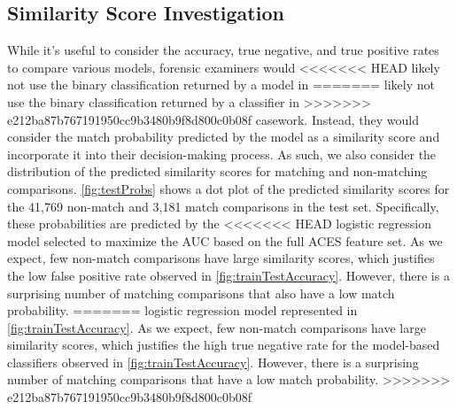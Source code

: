 \documentclass[reprint]{JASA}
\begin{document}
\hypertarget{similarity-score-investigation}{%
\subsection{Similarity Score
Investigation}\label{similarity-score-investigation}}

While it's useful to consider the accuracy, true negative, and true
positive rates to compare various models, forensic examiners would
<<<<<<< HEAD
likely not use the binary classification returned by a model in
=======
likely not use the binary classification returned by a classifier in
>>>>>>> e212ba87b767191950cc9b3480b9f8d800c0b08f
casework. Instead, they would consider the match probability predicted
by the model as a similarity score and incorporate it into their
decision-making process. As such, we also consider the distribution of
the predicted similarity scores for matching and non-matching
comparisons. \autoref{fig:testProbs} shows a dot plot of the predicted
similarity scores for the 41,769 non-match and 3,181 match comparisons
in the test set. Specifically, these probabilities are predicted by the
<<<<<<< HEAD
logistic regression model selected to maximize the AUC based on the full
ACES feature set. As we expect, few non-match comparisons have large
similarity scores, which justifies the low false positive rate observed
in \autoref{fig:trainTestAccuracy}. However, there is a surprising
number of matching comparisons that also have a low match probability.
=======
logistic regression model represented in
\autoref{fig:trainTestAccuracy}. As we expect, few non-match comparisons
have large similarity scores, which justifies the high true negative
rate for the model-based classifiers observed in
\autoref{fig:trainTestAccuracy}. However, there is a surprising number
of matching comparisons that have a low match probability.
>>>>>>> e212ba87b767191950cc9b3480b9f8d800c0b08f
\end{document}
